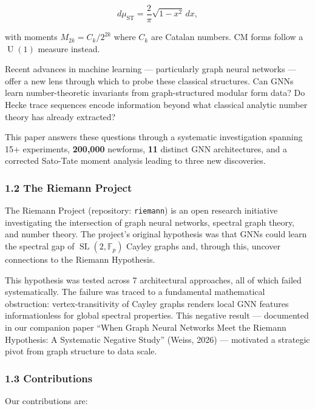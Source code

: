 \documentclass[
]{article}
\begin{document}
\[d\mu_{\text{ST}} = \frac{2}{\pi}\sqrt{1-x^2}\,dx,\]

with moments \(M_{2k} = C_k / 2^{2k}\) where \(C_k\) are Catalan
numbers. CM forms follow a \(\operatorname{U}(1)\) measure instead.

Recent advances in machine learning --- particularly graph neural
networks --- offer a new lens through which to probe these classical
structures. Can GNNs learn number-theoretic invariants from
graph-structured modular form data? Do Hecke trace sequences encode
information beyond what classical analytic number theory has already
extracted?

This paper answers these questions through a systematic investigation
spanning 15+ experiments, \textbf{200,000} newforms, \textbf{11}
distinct GNN architectures, and a corrected Sato-Tate moment analysis
leading to three new discoveries.

\hypertarget{the-riemann-project}{%
\subsubsection{1.2 The Riemann Project}\label{the-riemann-project}}

The Riemann Project (repository: \texttt{riemann}) is an open research
initiative investigating the intersection of graph neural networks,
spectral graph theory, and number theory. The project's original
hypothesis was that GNNs could learn the spectral gap of
\(\operatorname{SL}(2,\mathbb{F}_p)\) Cayley graphs and, through this,
uncover connections to the Riemann Hypothesis.

This hypothesis was tested across 7 architectural approaches, all of
which failed systematically. The failure was traced to a fundamental
mathematical obstruction: vertex-transitivity of Cayley graphs renders
local GNN features informationless for global spectral properties. This
negative result --- documented in our companion paper ``When Graph
Neural Networks Meet the Riemann Hypothesis: A Systematic Negative
Study'' (Weiss, 2026) --- motivated a strategic pivot from graph
structure to data scale.

\hypertarget{contributions}{%
\subsubsection{1.3 Contributions}\label{contributions}}

Our contributions are:
\end{document}
